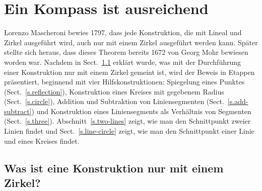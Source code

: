 
\chapter{Ein Kompass ist ausreichend}\label{c.compass}



Lorenzo Mascheroni bewies 1797, dass jede Konstruktion, die mit Lineal und Zirkel ausgeführt wird, auch nur mit einem Zirkel ausgeführt werden kann. Später stellte sich heraus, dass dieses Theorem bereits 1672 von Georg Mohr bewiesen worden war.
Nachdem in Sect.~\ref{s.compass-what} erklärt wurde, was mit der Durchführung einer Konstruktion nur mit einem Zirkel gemeint ist, wird der Beweis in Etappen präsentiert, beginnend mit vier Hilfskonstruktionen: Spiegelung eines Punktes (Sect.~\ref{s.reflection}), Konstruktion eines Kreises mit gegebenem Radius (Sect.~\ref{s.circle}), Addition und Subtraktion von Liniensegmenten (Sect.~\ref{s.add-subtract}) und Konstruktion eines Liniensegments als Verhältnis von Segmenten (Sect.~\ref{s.three}). Abschnitt~\ref{s.two-lines} zeigt, wie man den Schnittpunkt zweier Linien findet und Sect.~\ref{s.line-circle} zeigt, wie man den Schnittpunkt einer Linie und eines Kreises findet.


\section{Was ist eine Konstruktion nur mit einem Zirkel?}\label{s.compass-what}

